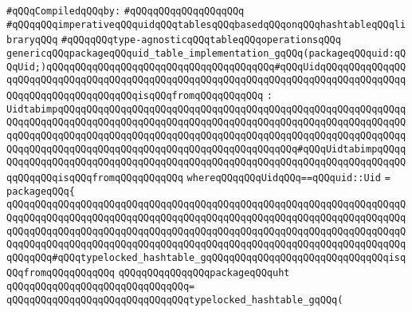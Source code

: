 \label{src/lib/c-kit/src/ast/uidtabimp-g.pkg}
\newline
\verb|#qQQqCompiledqQQqby:|\newline
\verb|#qQQqqQQqqQQqqQQqqQQq|\newline
\newline
\verb|#qQQqqQQqimperativeqQQquidqQQqtablesqQQqbasedqQQqonqQQqhashtableqQQqlibraryqQQq|\newline
\verb|#qQQqqQQqtype-agnosticqQQqtableqQQqoperationsqQQq|\newline
\newline
\verb|genericqQQqpackageqQQquid_table_implementation_gqQQq(packageqQQquid:qQQqUid;)qQQqqQQqqQQqqQQqqQQqqQQqqQQqqQQqqQQqqQQq#qQQqUidqQQqqQQqqQQqqQQqqQQqqQQqqQQqqQQqqQQqqQQqqQQqqQQqqQQqqQQqqQQqqQQqqQQqqQQqqQQqqQQqqQQqqQQqqQQqqQQqqQQqqQQqqQQqisqQQqfromqQQqqQQqqQQq|\newline
\verb|:|\newline
\verb|UidtabimpqQQqqQQqqQQqqQQqqQQqqQQqqQQqqQQqqQQqqQQqqQQqqQQqqQQqqQQqqQQqqQQqqQQqqQQqqQQqqQQqqQQqqQQqqQQqqQQqqQQqqQQqqQQqqQQqqQQqqQQqqQQqqQQqqQQqqQQqqQQqqQQqqQQqqQQqqQQqqQQqqQQqqQQqqQQqqQQqqQQqqQQqqQQqqQQqqQQqqQQqqQQqqQQqqQQqqQQqqQQqqQQqqQQqqQQqqQQqqQQqqQQqqQQqqQQq#qQQqUidtabimpqQQqqQQqqQQqqQQqqQQqqQQqqQQqqQQqqQQqqQQqqQQqqQQqqQQqqQQqqQQqqQQqqQQqqQQqqQQqqQQqqQQqisqQQqfromqQQqqQQqqQQq|\newline
\verb|whereqQQqqQQqUidqQQq==qQQquid::Uid|\newline
\verb|=|\newline
\verb|packageqQQq{|\newline
\verb|qQQqqQQqqQQqqQQqqQQqqQQqqQQqqQQqqQQqqQQqqQQqqQQqqQQqqQQqqQQqqQQqqQQqqQQqqQQqqQQqqQQqqQQqqQQqqQQqqQQqqQQqqQQqqQQqqQQqqQQqqQQqqQQqqQQqqQQqqQQqqQQqqQQqqQQqqQQqqQQqqQQqqQQqqQQqqQQqqQQqqQQqqQQqqQQqqQQqqQQqqQQqqQQqqQQqqQQqqQQqqQQqqQQqqQQqqQQqqQQqqQQqqQQqqQQqqQQqqQQqqQQqqQQqqQQqqQQqqQQqqQQqqQQq#qQQqtypelocked_hashtable_gqQQqqQQqqQQqqQQqqQQqqQQqqQQqqQQqisqQQqfromqQQqqQQqqQQq|\newline
\verb|qQQqqQQqqQQqqQQqpackageqQQquht|\newline
\verb|qQQqqQQqqQQqqQQqqQQqqQQqqQQqqQQq=|\newline
\verb|qQQqqQQqqQQqqQQqqQQqqQQqqQQqqQQqtypelocked_hashtable_gqQQq(|\newline
